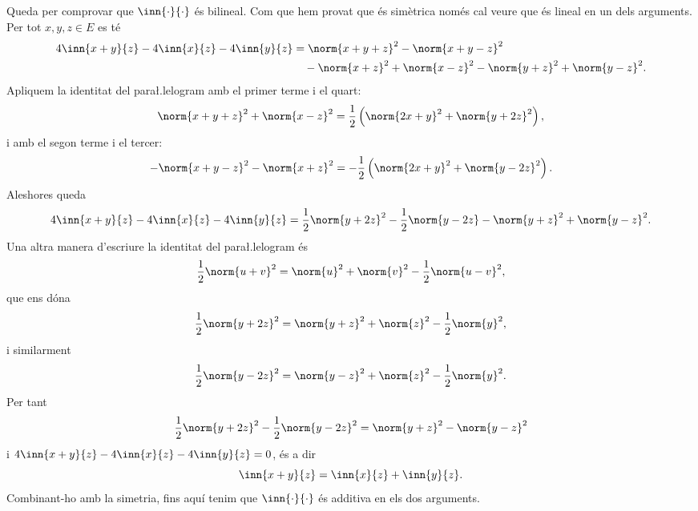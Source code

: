 \documentclass[12pt]{article}
\begin{document}
Queda per comprovar que \( \inn{\cdot}{\cdot} \) és bilineal. Com que hem provat que és
simètrica només cal veure que és lineal en un dels arguments. Per tot \( x,y, z \in E \)
es té
\begin{align*}
	4\inn{x+y}{z} - 4\inn{x}{z} - 4\inn{y}{z}	& = \norm{x+y+z}^2 - \norm{x+y-z}^2 \\
																						& \quad -	\norm{x+z}^2 + \norm{x-z}^2 -
																						\norm{y+z}^2 + \norm{y-z}^2.
\end{align*}
Apliquem la identitat del para\l.lelogram amb el primer terme i el quart:
\begin{equation*}
	\norm{x+y+z}^2 + \norm{x-z}^2 = \frac{1}{2}\left(\norm{2x + y}^2 + \norm{y +
	2z}^2\right),
\end{equation*}
i amb el segon terme i el tercer:
\begin{equation*}
	-\norm{x+y-z}^2 - \norm{x+z}^2 = -\frac{1}{2}\left(\norm{2x+y}^2 + \norm{y-2z}^2\right).
\end{equation*}
Aleshores queda
\begin{equation*}
	4\inn{x+y}{z} - 4\inn{x}{z} - 4\inn{y}{z}	= \frac{1}{2}\norm{y + 2z}^2 -
	\frac{1}{2}\norm{y-2z} - \norm{y+z}^2 + \norm{y-z}^2.
\end{equation*}
Una altra manera d'escriure la identitat del para\l.lelogram és
\begin{equation*}
	\frac{1}{2}\norm{u+v}^2 = \norm{u}^2 + \norm{v}^2 - \frac{1}{2}\norm{u-v}^2,
\end{equation*}
que ens dóna
\begin{equation*}
	\frac{1}{2}\norm{y+2z}^2 = \norm{y+z}^2 + \norm{z}^2 - \frac{1}{2}\norm{y}^2,
\end{equation*}
i similarment
\begin{equation*}
	\frac{1}{2}\norm{y-2z}^2 = \norm{y-z}^2 +\norm{z}^2 - \frac{1}{2}\norm{y}^2.
\end{equation*}
Per tant
\begin{equation*}
	\frac{1}{2}\norm{y+2z}^2 - \frac{1}{2}\norm{y-2z}^2 = \norm{y+z}^2 - \norm{y-z}^2
\end{equation*}
i \( 4\inn{x+y}{z} - 4\inn{x}{z} - 4\inn{y}{z} = 0 \), és a dir
\begin{equation*}
	\inn{x+y}{z} = \inn{x}{z} + \inn{y}{z}.
\end{equation*}
Combinant-ho amb la simetria, fins aquí tenim que \( \inn{\cdot}{\cdot} \) és additiva en
els dos arguments.
\end{document}
